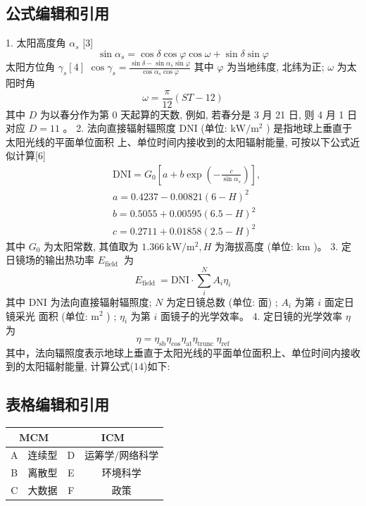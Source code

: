 \documentclass[a4paper,12pt]{article}
\begin{document}
\subsection{公式编辑和引用}
    1. 太阳高度角 \(\alpha_{s}\) [3] 
    \[\sin \alpha_s=\cos \delta \cos \varphi \cos \omega+\sin \delta \sin \varphi\]
    太阳方位角 \(\gamma_{s}[4]\)
    \(\cos \gamma_{s}=\frac{\sin \delta-\sin \alpha_{s} \sin \varphi}{\cos \alpha_{s} \cos \varphi}\)
    其中 \(\varphi\) 为当地纬度, 北纬为正; \(\omega\) 为太阳时角
    \[\omega=\frac{\pi}{12}(S T-12)\]
    其中 \(D\) 为以春分作为第 0 天起算的天数, 例如, 若春分是 3 月 21 日, 则 4 月 1 日对应 \(D=11\) 。
    2. 法向直接辐射辐照度 DNI (单位: \(\mathrm{kW} / \mathrm{m}^{2}\) ) 是指地球上垂直于太阳光线的平面单位面积
    上、单位时间内接收到的太阳辐射能量, 可按以下公式近似计算[6]
    \[
    \begin{aligned}
    & \mathrm{DNI}=G_{0}\left[a+b \exp \left(-\frac{c}{\sin \alpha_{s}}\right)\right], \\
    & a=0.4237-0.00821(6-H)^{2} \\
    & b=0.5055+0.00595(6.5-H)^{2} \\
    & c=0.2711+0.01858(2.5-H)^{2}
    \end{aligned}
    \]
    其中 \(G_{0}\) 为太阳常数, 其值取为 \(1.366 \mathrm{~kW} / \mathrm{m}^{2}, H\) 为海拔高度 (单位: \(\mathrm{km}\) )。
    3. 定日镜场的输出热功率 \(E_{\text {field }}\) 为
    \[E_{\text {field }}=\mathrm{DNI} \cdot \sum_{i}^{N} A_{i} \eta_{i}\]
    其中 DNI 为法向直接辐射辐照度; \(N\) 为定日镜总数 (单位: 面) ; \(A_{i}\) 为第 \(i\) 面定日镜采光
    面积 (单位: \(\mathrm{m}^{2}\) ) ; \(\eta_{i}\) 为第 \(i\) 面镜子的光学效率。
    4. 定日镜的光学效率 \(\eta\) 为
    \[\eta=\eta_{\mathrm{sb}} \eta_{\mathrm{cos}} \eta_{\mathrm{at}} \eta_{\text {trunc }} \eta_{\mathrm{ref}}\]
    其中，法向辐照度表示地球上垂直于太阳光线的平面单位面积上、单位时间内接收到的太阳辐射能量, 计算公式(14)如下:

\subsection{表格编辑和引用}
    \begin{tabular}{|c|c|c|c|}
        \hline
        \multicolumn{2}{|c|}{MCM} & \multicolumn{2}{|c|}{ICM} \\
        \hline
        A & 连续型 & D & 运筹学/网络科学\\
        \hline
        B & 离散型 & E & 环境科学\\
        \hline
        C & 大数据 & F & 政策\\
        \hline
    \end{tabular}
    
\end{document}
